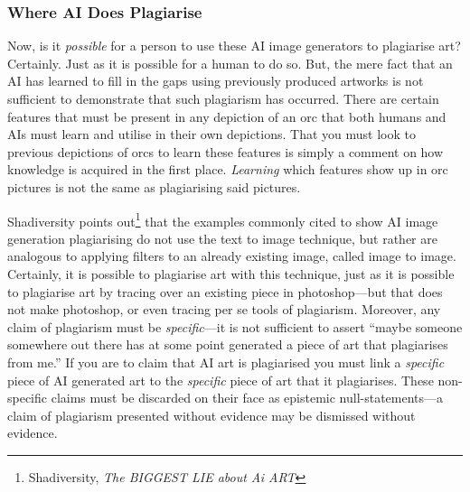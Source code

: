 \documentclass[11pt]{article}
\begin{document}
\subsubsection*{Where AI Does Plagiarise}
\label{sec:orge6796f8}
Now, is it \emph{possible} for a person to use these AI image generators to plagiarise art? Certainly. Just as it is possible for a human to do so. But, the mere fact that an AI has learned to fill in the gaps using previously produced artworks is not sufficient to demonstrate that such plagiarism has occurred. There are certain features that must be present in any depiction of an orc that both humans and AIs must learn and utilise in their own depictions. That you must look to previous depictions of orcs to learn these features is simply a comment on how knowledge is acquired in the first place. \emph{Learning} which features show up in orc pictures is not the same as plagiarising said pictures.

Shadiversity points out\footnote{Shadiversity, \emph{The BIGGEST LIE about Ai ART}} that the examples commonly cited to show AI image generation plagiarising do not use the text to image technique, but rather are analogous to applying filters to an already existing image, called image to image. Certainly, it is possible to plagiarise art with this technique, just as it is possible to plagiarise art by tracing over an existing piece in photoshop---but that does not make photoshop, or even tracing per se tools of plagiarism. Moreover, any claim of plagiarism must be \emph{specific}---it is not sufficient to assert ``maybe someone somewhere out there has at some point generated a piece of art that plagiarises from me.'' If you are to claim that AI art is plagiarised you must link a \emph{specific} piece of AI generated art to the \emph{specific} piece of art that it plagiarises. These non-specific claims must be discarded on their face as epistemic null-statements---a claim of plagiarism presented without evidence may be dismissed without evidence.
\end{document}
